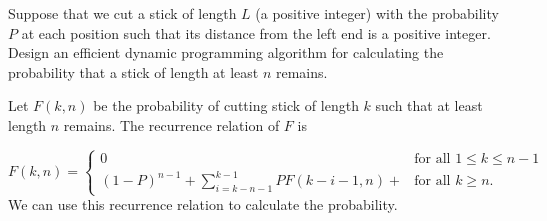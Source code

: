 \begin{Exercise}[origin={NCNU CSIE 93}]
Suppose that we cut a stick of length $L$ (a positive integer) with the probability $P$ at each position such that its distance from the left end is a positive integer.
Design an efficient dynamic programming algorithm for calculating the probability that a stick of length at least $n$ remains.
\end{Exercise}
\begin{Answer}
Let $F(k, n)$ be the probability of cutting stick of length $k$ such that at least length $n$ remains. The recurrence relation of $F$ is 

\[ F(k, n) = 
   \begin{cases}
       0 & \text{for all } 1 \leq k \leq n-1 \\ 
       (1-P)^{n-1} + \sum_{i=k-n-1}^{k-1} PF(k-i-1, n) +  & \text{for all } k \geq n.
    \end{cases} \]
We can use this recurrence relation to calculate the probability.    
\end{Answer}
\printbibliography[heading=subbibliography]
